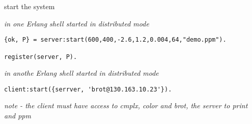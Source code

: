 \begin{frame}[fragile]{start the system}

{\em in one Erlang shell started in distributed mode}

\begin{verbatim}
{ok, P} = server:start(600,400,-2.6,1.2,0.004,64,"demo.ppm").

register(server, P).
\end{verbatim}

{\em in anothe Erlang shell started in distributed mode}

\begin{verbatim}
client:start({serrver, 'brot@130.163.10.23'}).
\end{verbatim}

\vspace{20pt}
{\em note - the client must have access to cmplx, color and brot, the server to print and ppm}

\end{frame}






